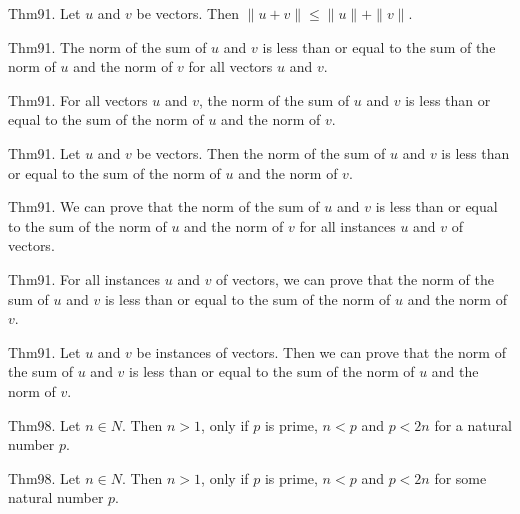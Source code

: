 \documentclass{article}
\begin{document}
Thm91. Let $u$ and $v$ be vectors. Then $\| u + v \| \leq \| u \| + \| v \|$.

Thm91. The norm of the sum of $u$ and $v$ is less than or equal to the sum of the norm of $u$ and the norm of $v$ for all vectors $u$ and $v$.

Thm91. For all vectors $u$ and $v$, the norm of the sum of $u$ and $v$ is less than or equal to the sum of the norm of $u$ and the norm of $v$.

Thm91. Let $u$ and $v$ be vectors. Then the norm of the sum of $u$ and $v$ is less than or equal to the sum of the norm of $u$ and the norm of $v$.

Thm91. We can prove that the norm of the sum of $u$ and $v$ is less than or equal to the sum of the norm of $u$ and the norm of $v$ for all instances $u$ and $v$ of vectors.

Thm91. For all instances $u$ and $v$ of vectors, we can prove that the norm of the sum of $u$ and $v$ is less than or equal to the sum of the norm of $u$ and the norm of $v$.

Thm91. Let $u$ and $v$ be instances of vectors. Then we can prove that the norm of the sum of $u$ and $v$ is less than or equal to the sum of the norm of $u$ and the norm of $v$.

Thm98. Let $n \in N$. Then $n > 1$, only if $p$ is prime, $n < p$ and $p < 2 n$ for a natural number $p$.

Thm98. Let $n \in N$. Then $n > 1$, only if $p$ is prime, $n < p$ and $p < 2 n$ for some natural number $p$.
\end{document}
